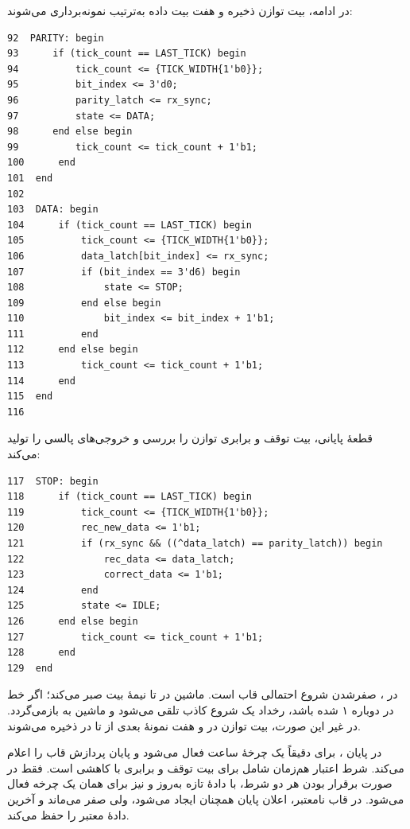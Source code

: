 در ادامه، بیت توازن ذخیره و هفت بیت داده به‌ترتیب نمونه‌برداری می‌شوند:

\begin{dsdlcodeblock}
\begin{verbatim}
92  PARITY: begin
93      if (tick_count == LAST_TICK) begin
94          tick_count <= {TICK_WIDTH{1'b0}};
95          bit_index <= 3'd0;
96          parity_latch <= rx_sync;
97          state <= DATA;
98      end else begin
99          tick_count <= tick_count + 1'b1;
100      end
101  end
102
103  DATA: begin
104      if (tick_count == LAST_TICK) begin
105          tick_count <= {TICK_WIDTH{1'b0}};
106          data_latch[bit_index] <= rx_sync;
107          if (bit_index == 3'd6) begin
108              state <= STOP;
109          end else begin
110              bit_index <= bit_index + 1'b1;
111          end
112      end else begin
113          tick_count <= tick_count + 1'b1;
114      end
115  end
116
\end{verbatim}
\end{dsdlcodeblock}

قطعهٔ پایانی، بیت توقف و برابری توازن را بررسی و خروجی‌های پالسی را تولید می‌کند:

\begin{dsdlcodeblock}
\begin{verbatim}
117  STOP: begin
118      if (tick_count == LAST_TICK) begin
119          tick_count <= {TICK_WIDTH{1'b0}};
120          rec_new_data <= 1'b1;
121          if (rx_sync && ((^data_latch) == parity_latch)) begin
122              rec_data <= data_latch;
123              correct_data <= 1'b1;
124          end
125          state <= IDLE;
126      end else begin
127          tick_count <= tick_count + 1'b1;
128      end
129  end
\end{verbatim}
\end{dsdlcodeblock}

در ، صفرشدن  شروع احتمالی قاب است. ماشین در  تا
نیمهٔ بیت صبر می‌کند؛ اگر خط در  دوباره ۱ شده باشد، رخداد یک شروع کاذب
تلقی می‌شود و ماشین به  بازمی‌گردد. در غیر این صورت، بیت توازن در
 و هفت نمونهٔ بعدی از  تا  در
 ذخیره می‌شوند.

در پایان ،  برای دقیقاً یک چرخهٔ ساعت فعال می‌شود و پایان
پردازش قاب را اعلام می‌کند. شرط اعتبار هم‌زمان شامل  برای بیت توقف و
برابری  با  کاهشی  است. فقط در صورت
برقرار بودن هر دو شرط،  با دادهٔ تازه به‌روز و  نیز
برای همان یک چرخه فعال می‌شود. در قاب نامعتبر، اعلان پایان همچنان ایجاد می‌شود، ولی
 صفر می‌ماند و  آخرین دادهٔ معتبر را حفظ می‌کند.


